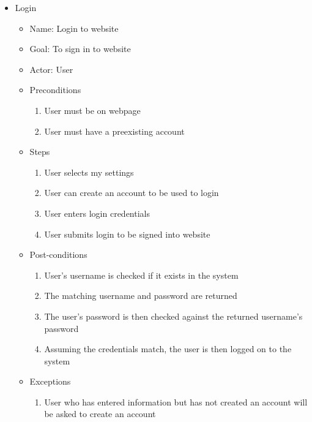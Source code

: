 \begin{itemize}
\item Login
	\begin{itemize}
	\item Name: Login to website
    \item Goal: To sign in to website
    \item Actor: User
    \item Preconditions
		\begin{enumerate}
		\item User must be on webpage
        \item User must have a preexisting account
        \end{enumerate}
    \item Steps
    	\begin{enumerate}
		\item User selects my settings
        \item User can create an account to be used to login
        \item User enters login credentials
        \item User submits login to be signed into website
        \end{enumerate}
    \item Post-conditions
		\begin{enumerate}
		\item User's username is checked if it exists in the system
        \item The matching username and password are returned 
        \item The user's password is then checked against the returned username's password
        \item Assuming the credentials match, the user is then logged on to the system
        \end{enumerate}
    \item Exceptions
    	\begin{enumerate} 
    	\item User who has entered information but has not created an account will be asked to create an account
        \end{enumerate}
    \end{itemize}
    

\end{itemize}
